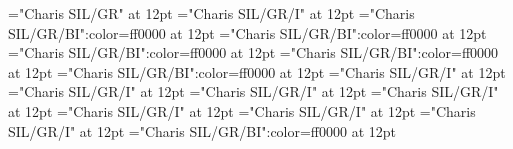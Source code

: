 \documentclass[a4paper]{article}
\begin{document}
\pagestyle{plain}
\sloppy
\setlength{\parfillskip}{0pt plus 1fil}
\font\sectionletter="Charis SIL/GR" at 12pt
\font\articlesectionletter="Charis SIL/GR/I" at 12pt
\font\sensearticlesectionletter="Charis SIL/GR/BI":color=ff0000 at 12pt
\font\grammarcategoryfirstoftypesensearticlesectionletter="Charis SIL/GR/BI":color=ff0000 at 12pt
\font{}="Charis SIL/GR/BI":color=ff0000 at 12pt
\font\wordusefirstoftypedefinitionfirstoftypesensearticlesectionletter="Charis SIL/GR/BI":color=ff0000 at 12pt
\font\examplefirstoftypesensearticlesectionletter="Charis SIL/GR/BI":color=ff0000 at 12pt
\font\subentryfirstoftypearticlesectionletter="Charis SIL/GR/I" at 12pt
\font\headwordfirstoftypesubentryfirstoftypearticlesectionletter="Charis SIL/GR/I" at 12pt
\font\examplefirstoftypesubentryfirstoftypearticlesectionletter="Charis SIL/GR/I" at 12pt
\font\headwordfirstoftypearticlesectionletter="Charis SIL/GR/I" at 12pt
\font\pronunciationfirstoftypearticlesectionletter="Charis SIL/GR/I" at 12pt
\font\stressfirstoftypepronunciationfirstoftypearticlesectionletter="Charis SIL/GR/I" at 12pt
\font\variantinflectionarticlesectionletter="Charis SIL/GR/I" at 12pt
\font\exampleusefirstoftypesensearticlesectionletter="Charis SIL/GR/BI":color=ff0000 at 12pt

\mbox{} 
\newpage 
\newpage 
\setcounter{page}{1} 
\pagestyle{fancy} 
\end{document}
